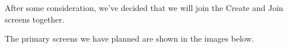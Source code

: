 \documentclass{article}
\begin{document}
After some consideration, we've decided that we will join the Create and Join screens together.

The primary screens we have planned are shown in the images below.

\begin{center}

\end{center}
\end{document}
